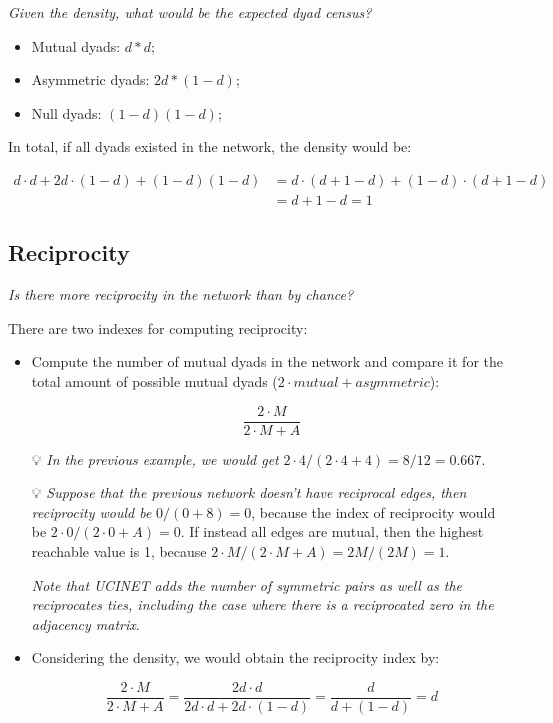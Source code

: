 \documentclass[
  notitlepage,
  onecolumn,
  openany]{book}
\providecommand{\tightlist}{%
  \setlength{\itemsep}{0pt}\setlength{\parskip}{0pt}}
\begin{document}
\emph{Given the density, what would be the expected dyad census?}

\begin{itemize}
\tightlist
\item
  Mutual dyads: \(d*d\);
\item
  Asymmetric dyads: \(2d*(1-d)\);
\item
  Null dyads: \((1-d)(1-d)\);
\end{itemize}

In total, if all dyads existed in the network, the density would be:

\[
\begin{aligned}
d \cdot d+2d\cdot (1-d)+(1-d)(1-d)&= d\cdot(d+1-d)+(1-d)\cdot(d+1-d) \\
&= d+1-d = 1
\end{aligned}
\]

\hypertarget{reciprocity}{%
\subsection{Reciprocity}\label{reciprocity}}

\emph{Is there more reciprocity in the network than by chance?}

There are two indexes for computing reciprocity:

\begin{itemize}
\item
  Compute the number of mutual dyads in the network and compare it for the total amount of possible mutual dyads (\(2 \cdot mutual + asymmetric\)):

  \[
    \frac{2\cdot M}{2\cdot M+A}
    \]

  💡 \emph{In the previous example, we would get} \(2\cdot4/(2\cdot4+4) = 8/12 = 0.667\).

  💡 \emph{Suppose that the previous network doesn't have reciprocal edges, then reciprocity would be} \(0/(0+8) = 0\), because the index of reciprocity would be \(2\cdot 0/(2\cdot 0+A) = 0\). If instead all edges are mutual, then the highest reachable value is 1, because \(2\cdot M/(2\cdot M+A) = 2M/(2M) = 1\).

  \emph{Note that UCINET adds the number of symmetric pairs as well as the reciprocates ties, including the case where there is a reciprocated zero in the adjacency matrix}.\\
\item
  Considering the density, we would obtain the reciprocity index by:

  \[
    \frac{2\cdot M}{2\cdot M+A} = \frac{2d\cdot d}{2 d\cdot d+2d\cdot(1-d)} = \frac{d}{d+(1-d)} = d
    \]
\end{itemize}
\end{document}
